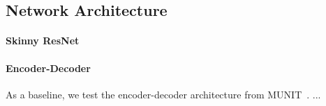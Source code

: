 \subsection{Network Architecture}

\paragraph{Skinny ResNet}

\paragraph{Encoder-Decoder} As a baseline, we test the encoder-decoder architecture from MUNIT~\cite{XX}. ...



 
